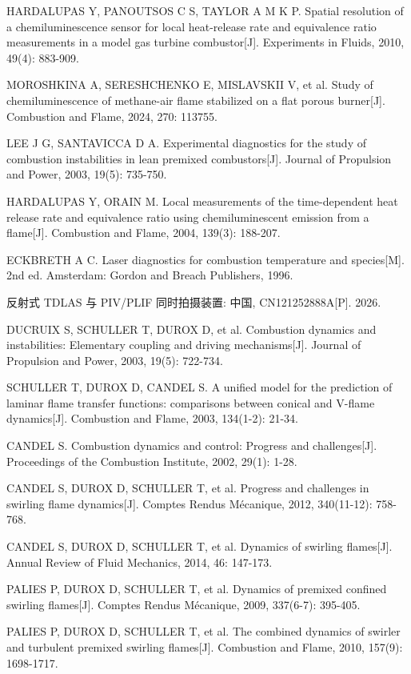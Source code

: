 \documentclass[UTF8,a4paper,zihao=-4,fontset=windows]{ctexart}
\begin{document}
{\begin{enumerate}[label={[\arabic*]}, leftmargin=2.2em,
  labelsep=0.2em, itemsep=0pt, parsep=0pt, topsep=2pt, partopsep=0pt]
\item HARDALUPAS Y, PANOUTSOS C S, TAYLOR A M K P. Spatial resolution of a chemiluminescence sensor for local heat-release rate and equivalence ratio measurements in a model gas turbine combustor[J]. Experiments in Fluids, 2010, 49(4): 883-909.
\item MOROSHKINA A, SERESHCHENKO E, MISLAVSKII V, et al. Study of chemiluminescence of methane-air flame stabilized on a flat porous burner[J]. Combustion and Flame, 2024, 270: 113755.
\item LEE J G, SANTAVICCA D A. Experimental diagnostics for the study of combustion instabilities in lean premixed combustors[J]. Journal of Propulsion and Power, 2003, 19(5): 735-750.
\item HARDALUPAS Y, ORAIN M. Local measurements of the time-dependent heat release rate and equivalence ratio using chemiluminescent emission from a flame[J]. Combustion and Flame, 2004, 139(3): 188-207.
\item ECKBRETH A C. Laser diagnostics for combustion temperature and species[M]. 2nd ed. Amsterdam: Gordon and Breach Publishers, 1996.
\item 反射式 TDLAS 与 PIV/PLIF 同时拍摄装置: 中国, CN121252888A[P]. 2026.
\item DUCRUIX S, SCHULLER T, DUROX D, et al. Combustion dynamics and instabilities: Elementary coupling and driving mechanisms[J]. Journal of Propulsion and Power, 2003, 19(5): 722-734.
\item SCHULLER T, DUROX D, CANDEL S. A unified model for the prediction of laminar flame transfer functions: comparisons between conical and V-flame dynamics[J]. Combustion and Flame, 2003, 134(1-2): 21-34.
\item CANDEL S. Combustion dynamics and control: Progress and challenges[J]. Proceedings of the Combustion Institute, 2002, 29(1): 1-28.
\item CANDEL S, DUROX D, SCHULLER T, et al. Progress and challenges in swirling flame dynamics[J]. Comptes Rendus Mécanique, 2012, 340(11-12): 758-768.
\item CANDEL S, DUROX D, SCHULLER T, et al. Dynamics of swirling flames[J]. Annual Review of Fluid Mechanics, 2014, 46: 147-173.
\item PALIES P, DUROX D, SCHULLER T, et al. Dynamics of premixed confined swirling flames[J]. Comptes Rendus Mécanique, 2009, 337(6-7): 395-405.
\item PALIES P, DUROX D, SCHULLER T, et al. The combined dynamics of swirler and turbulent premixed swirling flames[J]. Combustion and Flame, 2010, 157(9): 1698-1717.

\end{enumerate}}
\end{document}
